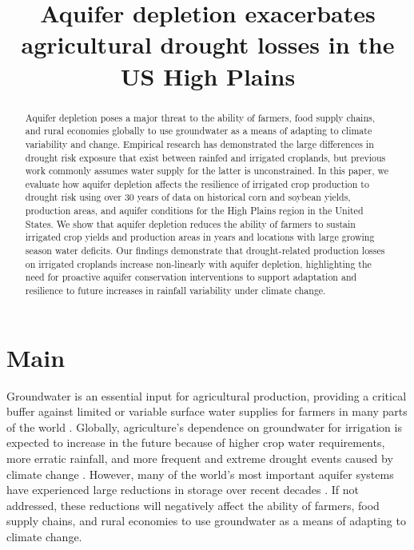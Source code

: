 \documentclass[
]{article}
\title{Aquifer depletion exacerbates agricultural drought losses in the US High Plains}
\author{}
\date{}
\begin{document}
\maketitle
\begin{abstract}
Aquifer depletion poses a major threat to the ability of farmers, food supply chains, and rural economies globally to use groundwater as a means of adapting to climate variability and change. Empirical research has demonstrated the large differences in drought risk exposure that exist between rainfed and irrigated croplands, but previous work commonly assumes water supply for the latter is unconstrained. In this paper, we evaluate how aquifer depletion affects the resilience of irrigated crop production to drought risk using over 30 years of data on historical corn and soybean yields, production areas, and aquifer conditions for the High Plains region in the United States. We show that aquifer depletion reduces the ability of farmers to sustain irrigated crop yields and production areas in years and locations with large growing season water deficits. Our findings demonstrate that drought-related production losses on irrigated croplands increase non-linearly with aquifer depletion, highlighting the need for proactive aquifer conservation interventions to support adaptation and resilience to future increases in rainfall variability under climate change.
\end{abstract}

\hypertarget{main}{%
\section{Main}\label{main}}

Groundwater is an essential input for agricultural production, providing a critical buffer against limited or variable surface water supplies for farmers in many parts of the world \citep{scanlon2023global}. Globally, agriculture's dependence on groundwater for irrigation is expected to increase in the future because of higher crop water requirements, more erratic rainfall, and more frequent and extreme drought events caused by climate change \citep{zhou2010impact, wada2013multimodel, wada2014sustainability, kreins2015quantification, florke2018water}. However, many of the world's most important aquifer systems have experienced large reductions in storage over recent decades \citep{wada2010global, famiglietti2011satellites, scanlon2012groundwater, konikow2015long, bierkens2019non}. If not addressed, these reductions will negatively affect the ability of farmers, food supply chains, and rural economies to use groundwater as a means of adapting to climate change.
\end{document}
